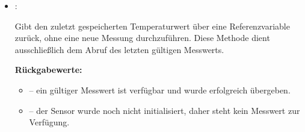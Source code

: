 \begin{itemize}
		\item {}:
		
		Gibt den zuletzt gespeicherten Temperaturwert über eine Referenzvariable zurück, ohne eine neue Messung durchzuführen.  Diese Methode dient ausschlie{\ss}lich dem Abruf des letzten gültigen Messwerts.  
		
		\textbf{Rückgabewerte:}
		\begin{itemize}
			\item {} – ein gültiger Messwert ist verfügbar und wurde erfolgreich übergeben. 
			\item {} – der Sensor wurde noch nicht initialisiert, daher steht kein Messwert zur Verfügung. 
		\end{itemize}
	\end{itemize}
	
{
}
	
{

}
	